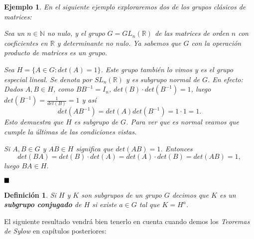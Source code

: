 \documentclass[12pt]{article}
\newtheorem{definition}[theorem]{Definición}
\newtheorem{example}{Ejemplo}[theorem]
\begin{document}
\begin{example}En el siguiente ejemplo exploraremos dos de los grupos clásicos de matrices:

Sea un $n \in \mathbb{N}$ no nulo, y el grupo $G = GL_{n}(\mathbb{R})$ de las matrices de orden $n$ con coeficientes en $\mathbb{R}$ y determinante no nulo. Ya sabemos que $G$ con la operación producto de matrices es un grupo.

Sea $H = \lbrace A \in G : det(A) = 1\rbrace$. Este grupo también lo vimos y es el \textit{grupo especial lineal}. Se denota por $SL_{n}(\mathbb{R})$ y es subgrupo normal de $G$. En efecto:\vspace{0.2cm}\\
Dados $A,B \in H$, como $BB^{-1} = I_{n}$, $det(B) \cdot det(B^{-1}) = 1$, luego $det(B^{-1}) = \frac{1}{det(B)} = 1$ y así $$det(AB^{-1}) = det(A)det(B^{-1}) = 1 \cdot 1 = 1.$$ Esto demuestra que $H$ es subgrupo de $G$. Para ver que es normal veamos que cumple la últimas de las condiciones vistas.


Si $A,B \in G$ y $AB \in H$ significa que $det(AB) = 1$. Entonces $$det(BA) = det(B)\cdot det(A) = det(A) \cdot det(B) = det(AB) = 1,$$ luego $BA \in H$.
\end{example}

$\hfill \blacksquare$

\begin{definition}Si $H$ y $K$ son subgrupos de un grupo $G$ decimos que $K$ es un \textbf{subgrupo conjugado} de $H$ si existe $a \in G$ tal que $K =H^{a}$.
\end{definition}

El siguiente resultado vendrá bien tenerlo en cuenta cuando demos los \textit{Teoremas de Sylow} en capítulos posteriores: 
\end{document}
